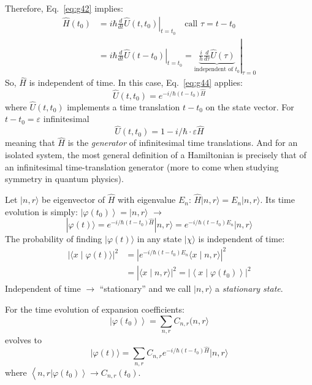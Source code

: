 \documentclass[12pt]{article}
\begin{document}
Therefore, Eq.~\ref{eq:g42} implies:
\begin{equation}
\begin{aligned} 
\hat{H}\left(t_{0}\right) 
&=\left.i \hbar \frac{d}{d t} \hat{U}\left(t, t_{0}\right)\right|_{t=t_{0}}
\quad\textrm{call }\tau=t-t_{0} \\ 
&=\left.i \hbar \frac{d}{d t} \hat{U}\left(t-t_{0}\right)\right|_{t=t_{0}}
=\left.\underbrace{\frac{i}{h} \frac{d}{d \tau} \hat{U}(\tau)}_{\textrm{independent of }t_0}\right|_{\tau=0}
\end{aligned}
\end{equation}
So, $\hat{H}$ is independent of time.
In this case, Eq.~\ref{eq:g44} applies:
\begin{equation}
\hat{U}\left(t, t_{0}\right)=e^{-i / \hbar\left(t-t_{0}\right) \hat{H}}
\end{equation}
where $\hat{U}\left(t, t_{0}\right)$ implements a time translation $t-t_0$
on the state vector.
For $t-t_0 = \varepsilon$ infinitesimal
\begin{equation}
\hat{U}\left(t, t_{0}\right)=1-i / \hbar \cdot \varepsilon \hat{H}
\end{equation}
meaning that $\hat{H}$ is the \emph{generator} of infinitesimal time translations.
And for an isolated system, the most
general definition of a Hamiltonian is
precisely that of an infinitesimal time-translation
generator (more to come when studying symmetry in quantum physics).


Let $|n,r\rangle$ be eigenvector of $\hat{H}$ with eigenvalue 
$E_n$: $\hat{H}|n, r\rangle=E_{n}|n, r\rangle$. Its time evolution
is simply: $\left.|\varphi(t_{0})\right\rangle=|n, r\rangle$ $\to$
\begin{equation}
|\varphi(t)\rangle=e^{-i / \hbar\left(t-t_{0}\right) \hat{H}}|n, r\rangle=e^{-i / \hbar\left(t-t_{0}\right) E_{n}}|n, r\rangle
\end{equation}
The probability of finding $|\varphi(t)\rangle$ in any
state $|\chi\rangle$ is independent of time:
\begin{equation}
\begin{aligned}|\langle x \mid \varphi(t)\rangle|^{2} &=\left|e^{-i / \hbar\left(t-t_{0}\right) E_{n}}\langle x \mid n, r\rangle\right|^{2} \\ &=\left|\left.\langle x \mid n, r\rangle\right|^{2}=\left|\left\langle x \mid \varphi\left(t_{0}\right)\right\rangle\right|^{2}\right.
\end{aligned}
\end{equation}
Independent of time $\to$ ``stationary'' and we call
$|n,r\rangle$ a \emph{stationary state}.

For the time evolution of expansion coefficients:
\begin{equation}
\left|\varphi\left(t_{0}\right)\right\rangle=\sum_{n, r} C_{n, r}(n, r\rangle
\end{equation}
evolves to
\begin{equation}
\mid \varphi(t)\rangle=\sum_{n, r}C_{n, r} e^{-i / \hbar\left(t-t_{0}\right) \hat{H}}|n, r\rangle
\end{equation}
where $\left\langle n, r\left|\varphi\left(t_{0}\right)\right\rangle \rightarrow C_{n, r}\left(t_{0}\right)\right.$.
\end{document}

